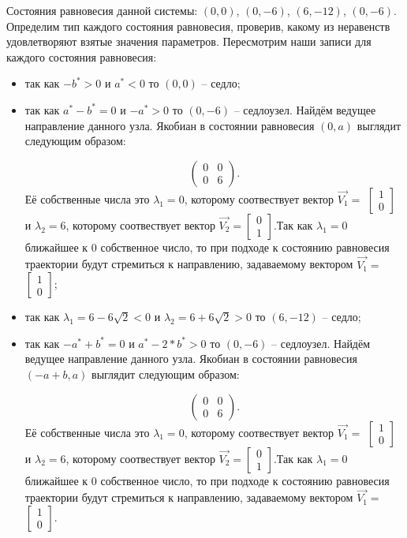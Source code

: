 Состояния равновесия данной системы: $(0, 0)$, $(0, -6)$, $(6, -12)$, $(0, -6)$. Определим тип каждого состояния равновесия, проверив, какому из неравенств удовлетворяют взятые значения параметров.  Пересмотрим наши записи для каждого состояния равновесия: 
\begin{itemize}
	\item{ так как $-b^\ast > 0 $ и $a^\ast  < 0 $ то $(0, 0)$ -- седло;}
	\item{ так как $a^\ast - b^\ast = 0 $ и $-a^\ast > 0 $ то $(0, -6)$ -- седлоузел. Найдём ведущее направление данного узла. Якобиан в состоянии равновесия $(0, a)$ выглядит следующим образом:
		
		$$\begin{pmatrix}0 & 0\\0 & 6\end{pmatrix}. $$Её собственные числа это $\lambda_1=0$, которому соотвествует вектор $\Vec{V_1}=$ $\left[\begin{matrix}1\\0\end{matrix}\right]$ и $\lambda_2=6$, которому соотвествует вектор $\Vec{V_2}=$$\left[\begin{matrix}0\\1\end{matrix}\right]$.Так как $\lambda_1=0$ ближайшее к $0$ собственное число, то при подходе к состоянию равновесия траектории будут стремиться к направлению, задаваемому вектором $\Vec{V_1}=$ $\left[\begin{matrix}1\\0\end{matrix}\right]$;}
	\item{ так как ${\lambda_{1}} = 6 - 6 \sqrt{2}$$  < 0 $ и ${\lambda_{2}} = 6 + 6 \sqrt{2}$$ > 0 $ то $(6, -12)$ -- седло;}
	\item{ так как $-a^\ast + b^\ast = 0 $ и $a^\ast - 2*b^\ast > 0 $ то $(0, -6)$ -- седлоузел. Найдём ведущее направление данного узла. Якобиан в состоянии равновесия $(-a + b, a)$ выглядит следующим образом:
		
		$$\begin{pmatrix}0 & 0\\0 & 6\end{pmatrix}. $$Её собственные числа это $\lambda_1=0$, которому соотвествует вектор $\Vec{V_1}=$ $\left[\begin{matrix}1\\0\end{matrix}\right]$ и $\lambda_2=6$, которому соотвествует вектор $\Vec{V_2}=$$\left[\begin{matrix}0\\1\end{matrix}\right]$.Так как $\lambda_1=0$ ближайшее к $0$ собственное число, то при подходе к состоянию равновесия траектории будут стремиться к направлению, задаваемому вектором $\Vec{V_1}=$ $\left[\begin{matrix}1\\0\end{matrix}\right]$.}
\end{itemize} 

